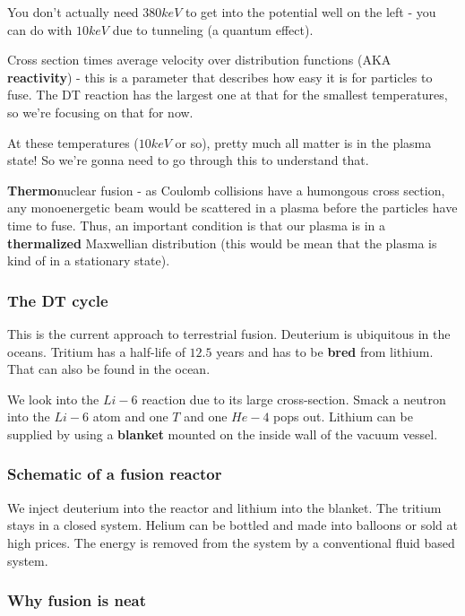 \documentclass[PlasmaNotes.tex]{subfiles}
\begin{document}
You don't actually need $380 keV$ to get into the potential well on the left - you can do with $10 keV$ due to tunneling (a quantum effect).


Cross section times average velocity over distribution functions (AKA \textbf{reactivity}) - this is a parameter that describes how easy it is for particles to fuse. The DT reaction has the largest one at that for the smallest temperatures, so we're focusing on that for now.

At these temperatures ($10 keV$ or so), pretty much all matter is in the plasma state! So we're gonna need to go through this to understand that.

\textbf{Thermo}nuclear fusion - as Coulomb collisions have a humongous cross section, any monoenergetic beam would be scattered in a plasma before the particles have time to fuse. Thus, an important condition is that our plasma is in a \textbf{thermalized} Maxwellian distribution (this would be mean that the plasma is kind of in a stationary state).

\subsubsection{The DT cycle}


This is the current approach to terrestrial fusion. Deuterium is ubiquitous in the oceans. Tritium has a half-life of $12.5$ years and has to be \textbf{bred} from lithium. That can also be found in the ocean.

We look into the $Li-6$ reaction due to its large cross-section. Smack a neutron into the $Li-6$ atom and one $T$ and one $He-4$ pops out. Lithium can be supplied by using a \textbf{blanket} mounted on the inside wall of the vacuum vessel.

\subsubsection{Schematic of a fusion reactor}

We inject deuterium into the reactor and lithium into the blanket. The tritium stays in a closed system. Helium can be bottled and made into balloons or sold at high prices. The energy is removed from the system by a conventional fluid based system.

\subsubsection{Why fusion is neat}
\end{document}
